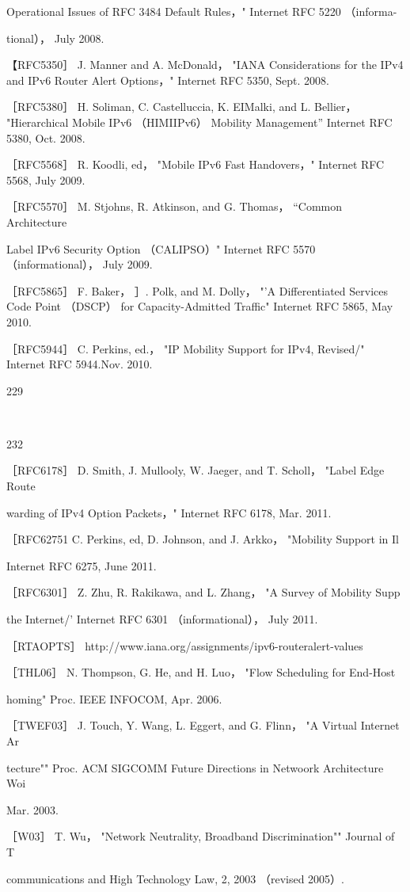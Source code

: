 Operational Issues of RFC 3484 Default Rules，" Internet RFC 5220 （informa-

tional）， July 2008.

【RFC5350］ J. Manner and A. McDonald， "IANA Considerations for the IPv4 and
IPv6 Router Alert Options，" Internet RFC 5350, Sept. 2008.

［RFC5380］ H. Soliman, C. Castelluccia, K. EIMalki, and L. Bellier， "Hierarchical
Mobile IPv6 （HIMIIPv6） Mobility Management” Internet RFC 5380, Oct. 2008.

［RFC5568］ R. Koodli, ed， "Mobile IPv6 Fast Handovers，" Internet RFC 5568, July
2009.

［RFC5570］ M. Stjohns, R. Atkinson, and G. Thomas， “Common Architecture

Label IPv6 Security Option （CALIPSO）" Internet RFC 5570 （informational）， July
2009.

［RFC5865］ F. Baker， ］. Polk, and M. Dolly， "'A Differentiated Services Code Point
（DSCP） for Capacity-Admitted Traffic" Internet RFC 5865, May 2010.

［RFC5944］ C. Perkins, ed.， "IP Mobility Support for IPv4, Revised/" Internet RFC
5944.Nov. 2010.

229

~

232

［RFC6178］ D. Smith, J. Mullooly, W. Jaeger, and T. Scholl， "Label Edge Route

warding of IPv4 Option Packets，" Internet RFC 6178, Mar. 2011.

［RFC62751 C. Perkins, ed, D. Johnson, and J. Arkko， "Mobility Support in Il

Internet RFC 6275, June 2011.

［RFC6301］ Z. Zhu, R. Rakikawa, and L. Zhang， "A Survey of Mobility Supp

the Internet/' Internet RFC 6301 （informational）， July 2011.

［RTAOPTS］ http://www.iana.org/assignments/ipv6-routeralert-values

［THL06］ N. Thompson, G. He, and H. Luo， "Flow Scheduling for End-Host

homing" Proc. IEEE INFOCOM, Apr. 2006.

［TWEF03］ J. Touch, Y. Wang, L. Eggert, and G. Flinn， "A Virtual Internet Ar

tecture"" Proc. ACM SIGCOMM Future Directions in Netwoork Architecture Woi

Mar. 2003.

［W03］ T. Wu， "Network Neutrality, Broadband Discrimination"" Journal of T

communications and High Technology Law, 2, 2003 （revised 2005）.



